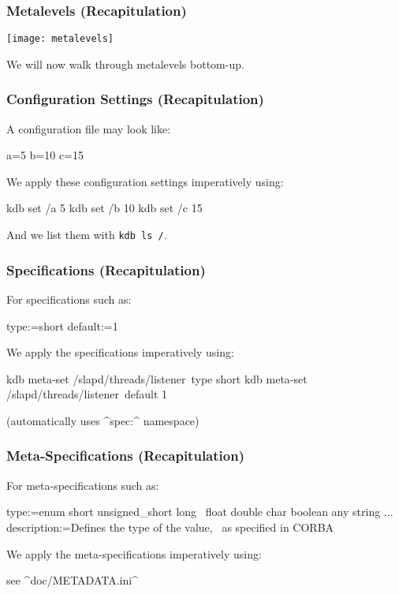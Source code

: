 \begin{frame}
	\frametitle{Metalevels (Recapitulation)}
	\texttt{[image: metalevels]}

	We will now walk through metalevels bottom-up.
\end{frame}

\begin{frame}[fragile]
	\frametitle{Configuration Settings (Recapitulation)}

	A configuration file may look like:

	\begin{code}[language=CfgElektra]
	a=5
	b=10
	c=15
	\end{code}

	We apply these configuration settings imperatively using:

	\begin{code}[language=bash]
	kdb set /a 5
	kdb set /b 10
	kdb set /c 15
	\end{code}

	And we list them with \lstinline[language=bash,morekeywords={ls},showspaces=no]^kdb ls /^.
\end{frame}

\begin{frame}[fragile]
	\frametitle{Specifications (Recapitulation)}
	For specifications such as:

	\begin{code}
	  type:=short
	  default:=1
	\end{code}

	We apply the specifications imperatively using:

	\begin{code}[language=bash,morekeywords={meta,set,default}]
	kdb meta-set /slapd/threads/listener\
		type short
	kdb meta-set /slapd/threads/listener\
		default 1
	\end{code}

	(automatically uses ^spec:^ namespace)
\end{frame}

\begin{frame}[fragile]
	\frametitle{Meta-Specifications (Recapitulation)}
	For meta-specifications such as:

	\small
	\begin{code}[gobble=4]
	[type]
	type:=enum short unsigned_short long \
		float double char boolean any string ...
	description:=Defines the type of the value, \
		 as specified in CORBA
	\end{code}

	We apply the meta-specifications imperatively using:


	\large
	see ^doc/METADATA.ini^
\end{frame}

